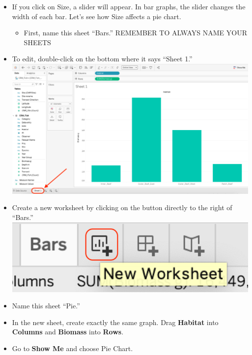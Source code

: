 \documentclass[
]{book}
\providecommand{\tightlist}{%
  \setlength{\itemsep}{0pt}\setlength{\parskip}{0pt}}
\begin{document}
\begin{enumerate}
  \begin{itemize}
  \tightlist
  \item
    If you click on Size, a slider will appear. In bar graphs, the slider changes the width of each bar. Let's see how Size affects a pie chart.

    \begin{itemize}
    \tightlist
    \item
      First, name this sheet ``Bars.'' {REMEMBER TO ALWAYS NAME YOUR SHEETS}\\
    \end{itemize}
  \item
    To edit, double-click on the bottom where it says ``Sheet 1.''
    \includegraphics{images/M3S2_rename-sheets.png}
  \item
    Create a new worksheet by clicking on the button directly to the right of ``Bars.''
    \includegraphics{images/M3S2_button.png}
  \item
    Name this sheet ``Pie.''
  \item
    In the new sheet, create exactly the same graph. Drag \textbf{Habitat} into \textbf{Columns} and \textbf{Biomass} into \textbf{Rows}.
  \item
    Go to \textbf{Show Me} and choose Pie Chart.


\end{itemize}
\end{enumerate}
\end{document}
